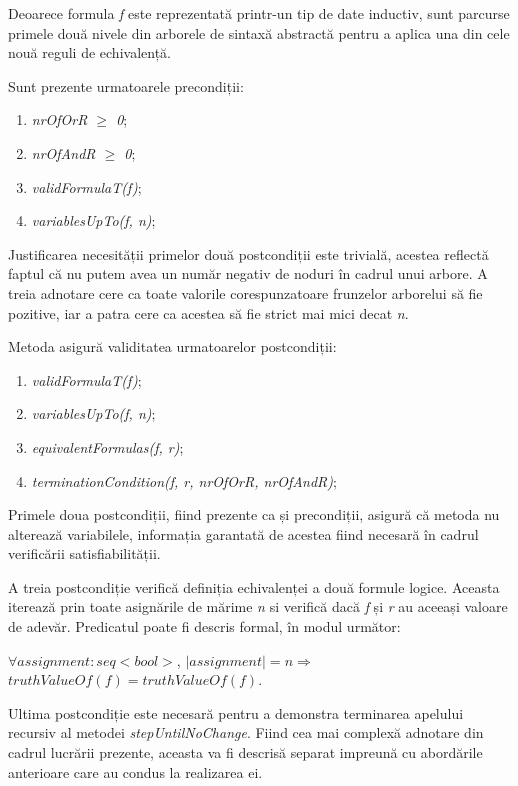 Deoarece formula \textit{f} este reprezentată printr-un tip de date inductiv, sunt parcurse primele două nivele din arborele de sintaxă abstractă pentru a aplica una din cele nouă reguli de echivalență.

Sunt prezente urmatoarele precondiții:
\begin{enumerate}
	\item \textit{nrOfOrR $\geq$ 0};
	\item \textit{nrOfAndR $\geq$ 0};
	\item \textit{validFormulaT(f)};
	\item \textit{variablesUpTo(f, n)};
\end{enumerate}

Justificarea necesității primelor două postcondiții este trivială, acestea reflectă faptul că nu putem avea un număr negativ de noduri în cadrul unui arbore.
A treia adnotare cere ca toate valorile corespunzatoare frunzelor arborelui să fie pozitive, iar a patra cere ca acestea să fie strict mai mici decat \textit{n}.

Metoda asigură validitatea urmatoarelor postcondiții:
\begin{enumerate}
	\item \textit{validFormulaT(f)};
	\item \textit{variablesUpTo(f, n)};
	\item \textit{equivalentFormulas(f, r)};
	\item \textit{terminationCondition(f, r, nrOfOrR, nrOfAndR)}; 
\end{enumerate} 

Primele doua postcondiții, fiind prezente ca și precondiții, asigură că metoda nu alterează variabilele, informația garantată de acestea fiind necesară în cadrul verificării satisfiabilității.

A treia postcondiție verifică definiția echivalenței a două formule logice. Aceasta iterează prin toate asignările de mărime \textit{n} si verifică dacă \textit{f} și \textit{r} au aceeași valoare de adevăr. Predicatul poate fi descris formal, în modul următor:
\begin{center}
$\forall assignment : seq<bool>$, $|assignment| = n \Rightarrow$ $truthValueOf(f) = truthValueOf(f)$.
\end{center}

Ultima postcondiție este necesară pentru a demonstra terminarea apelului recursiv al metodei \textit{stepUntilNoChange}. Fiind cea mai complexă adnotare din cadrul lucrării prezente, aceasta va fi descrisă separat impreună cu abordările anterioare care au condus la realizarea ei.


